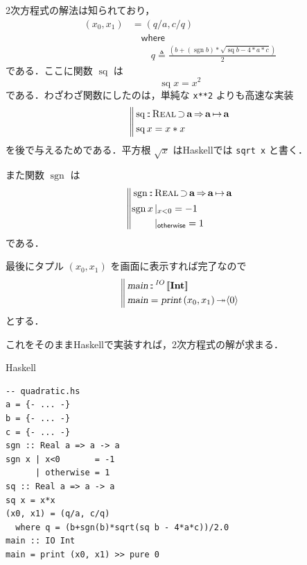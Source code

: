 \documentclass[a5paper,twoside,fleqn]{jsbook}
\def\[{\left[\!\left[}
\def\]{\right]\!\right]}
\DeclareMathOperator{\sgn}{sgn}
\newcommand{\programminglanguage}[1]{\textsf{#1}}
\newcommand{\haskell}{\programminglanguage{Haskell}}
\newcommand{\code}[1]{\texttt{#1}}
\newenvironment{haskellcode}{\begin{itembox}[r]{\haskell}}{\end{itembox}}
\newcommand{\mBrace}{\Vert}
\newcommand{\mKeyword}[1]{\mathsf{#1}} %
\newcommand{\mOtherwiseKeyword}{\mKeyword{otherwise}}
\newcommand{\mWhereKeyword}{\mKeyword{where}}
\DeclareMathOperator{\mOtherwise}{\mOtherwiseKeyword}
\DeclareMathOperator{\mSuperClass}{\Rightarrow}
\DeclareMathOperator{\mSuperSet}{\supset}
\DeclareMathOperator{\mWhere}{\mWhereKeyword}
\newcommand{\mSpecialFunc}[1]{\mathrm{#1}}
\DeclareMathOperator{\mSq}{\mSpecialFunc{sq}}
\newcommand{\mAction}[1]{\textsl{#1}}
\DeclareMathOperator{\mMain}{\mAction{main}}
\DeclareMathOperator{\mPrint}{\mAction{print}}
\DeclareMathOperator{\mBindRightIgnore}{\twoheadrightarrow}
\DeclareMathOperator{\mIn}{{:\!:}}
\DeclareMathOperator{\mLetEq}{\triangleq}
\DeclareMathOperator{\mMapsTo}{\mapsto}
\newcommand{\mType}[1]{\mathbf{#1}}
\newcommand{\mIntType}{\mType{Int}}
\newcommand{\mGenericTypeAssemble}[2]{{}^{\mTypeConstructor{#1}}\[\mType{#2}\]}
\newcommand{\mIOType}[1]{\mGenericTypeAssemble{IO}{#1}}
\newcommand{\mIOIntType}{\mIOType{\mIntType}}
\newcommand{\mTypeConstructor}[1]{\textit{#1}}
\newcommand{\mPureWith}[1]{\langle#1\rangle}
\newcommand{\mTupleWith}[1]{\left(#1\right)}
\newcommand{\mGenericTypeClass}[1]{\textsc{#1}} %
\newcommand{\mRealTypeClass}{\mGenericTypeClass{Real}}
\newcommand{\mGuard}[1]{\mathop{\mid_{#1}}}
\newcommand{\mProj}[2]{#1\mMapsTo#2}
\begin{document}
2次方程式の解法は知られており，
\begin{equation}
\begin{aligned}
\mTupleWith{x_0,x_1}&=\mTupleWith{q/a,c/q}\\
&\quad\mWhere\\
&\qquad q\mLetEq\frac{\left(b+(\sgn b)*\sqrt{\mSq b-4*a*c}\right)}{2}
\end{aligned}
\end{equation}
である．ここに関数 $\mSq$ は
\begin{equation}
\mSq x=x^2
\end{equation}
である．わざわざ関数にしたのは，単純な \code{x**2} よりも高速な実装
\begin{equation}
\left\mBrace
\begin{aligned}
&\mSq\mIn\mRealTypeClass\mSuperSet\mType{a}\mSuperClass\mProj{\mType{a}}{\mType{a}}\\
&\mSq x=x*x
\end{aligned}
\right.
\end{equation}
を後で与えるためである．平方根 $\sqrt{x}$ は\haskell では \code{sqrt
  x} と書く．

また関数 $\sgn$ は
\begin{equation}
\left\mBrace
\begin{aligned}
{}&\sgn\mIn{}\mRealTypeClass\mSuperSet\mType{a}\mSuperClass\mProj{\mType{a}}{\mType{a}}\\
{}&
\begin{aligned}
\sgn x&\mGuard{x<0}=-1\\
&\mGuard{\mOtherwise}=1
\end{aligned}
\end{aligned}
\right.
\end{equation}
である．

最後にタプル $\mTupleWith{x_0,x_1}$ を画面に表示すれば完了なので
\begin{equation}
\left\mBrace
\begin{aligned}
{}&\mMain\mIn\mIOIntType\\
{}&\mMain=\mPrint\mTupleWith{x_0,x_1}\mBindRightIgnore\mPureWith{0}
\end{aligned}
\right.
\end{equation}
とする．

これをそのまま\haskell で実装すれば，2次方程式の解が求まる．
\begin{haskellcode}
\begin{verbatim}
-- quadratic.hs
a = {- ... -}
b = {- ... -}
c = {- ... -}
sgn :: Real a => a -> a
sgn x | x<0       = -1
      | otherwise = 1
sq :: Real a => a -> a
sq x = x*x
(x0, x1) = (q/a, c/q)
  where q = (b+sgn(b)*sqrt(sq b - 4*a*c))/2.0
main :: IO Int
main = print (x0, x1) >> pure 0
\end{verbatim}
\end{haskellcode}
\end{document}
